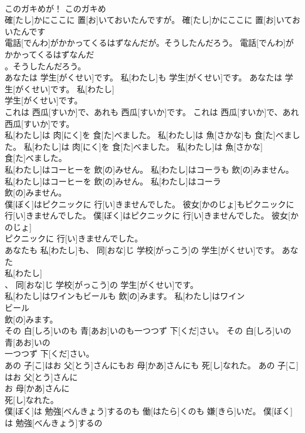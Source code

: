 \documentclass[8pt]{extreport}
\begin{document}
\begin{CJK}{UTF8}{min}
\\	このガキめが！	このガキめ
\\	確[たし]かにここに 置[お]いておいたんですが。	確[たし]かにここに 置[お]いておいたんです
\\	電話[でんわ]がかかってくるはずなんだが。そうしたんだろう。	電話[でんわ]がかかってくるはずなんだ
\\	。そうしたんだろう。	
\\	あなたは 学生[がくせい]です。 私[わたし]も 学生[がくせい]です。	あなたは 学生[がくせい]です。 私[わたし]
\\	学生[がくせい]です。	
\\	これは 西瓜[すいか]で、あれも 西瓜[すいか]です。	これは 西瓜[すいか]で、あれ
\\	西瓜[すいか]です。	
\\	私[わたし]は 肉[にく]を 食[た]べました。 私[わたし]は 魚[さかな]も 食[た]べました。	私[わたし]は 肉[にく]を 食[た]べました。 私[わたし]は 魚[さかな]
\\	食[た]べました。	
\\	私[わたし]はコーヒーを 飲[の]みせん。 私[わたし]はコーラも 飲[の]みません。	私[わたし]はコーヒーを 飲[の]みせん。 私[わたし]はコーラ
\\	飲[の]みません。	
\\	僕[ぼく]はピクニックに 行[い]きませんでした。 彼女[かのじょ]もピクニックに 行[い]きませんでした。	僕[ぼく]はピクニックに 行[い]きませんでした。 彼女[かのじょ]
\\	ピクニックに 行[い]きませんでした。	
\\	あなたも 私[わたし]も、 同[おな]じ 学校[がっこう]の 学生[がくせい]です。	あなた
\\	私[わたし]
\\	、 同[おな]じ 学校[がっこう]の 学生[がくせい]です。	
\\	私[わたし]はワインもビールも 飲[の]みます。	私[わたし]はワイン
\\	ビール
\\	飲[の]みます。	
\\	その 白[しろ]いのも 青[あお]いのも一つつず 下[くだ]さい。	その 白[しろ]いの
\\	青[あお]いの
\\	一つつず 下[くだ]さい。	
\\	あの 子[こ]はお 父[とう]さんにもお 母[かあ]さんにも 死[し]なれた。	あの 子[こ]はお 父[とう]さんに
\\	お 母[かあ]さんに
\\	死[し]なれた。	
\\	僕[ぼく]は 勉強[べんきょう]するのも 働[はたら]くのも 嫌[きら]いだ。	僕[ぼく]は 勉強[べんきょう]するの

\end{CJK}
\end{document}
